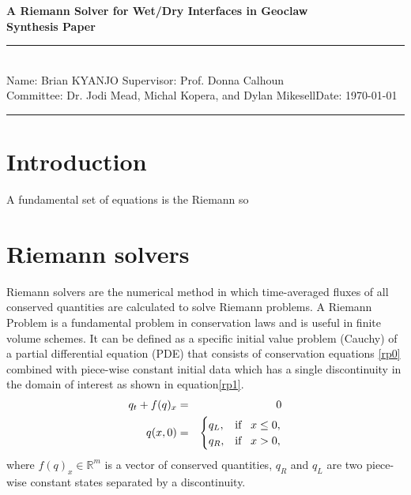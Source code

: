 \documentclass[12pt,a4paper]{article}
\newcommand{\donna}[1]{{\color{red}{#1}}}
\newcommand{\student}{Brian KYANJO }
\newcommand{\course}{Dr. Jodi Mead, Michal Kopera, and Dylan Mikesell}
\newcommand{\assignment}{ Prof. Donna Calhoun}
\begin{document}
	
	\thispagestyle{empty}
	\begin{center}
		\textbf{A Riemann Solver for Wet/Dry Interfaces in Geoclaw \\[0.5cm]
			Synthesis Paper}
		\vspace{.2cm}
	\end{center}
	
	
	\rule{17cm}{0.2cm}\\[0.3cm]
	Name: \student \hfill Supervisor: \assignment\\[0.1cm]
	Committee: \course \hfill Date: \today\\
	\rule{17cm}{0.05cm}
	\vspace{.2cm}
	
	\section{Introduction}
	
	\donna{Motivate five papers:   Dry and Wet states, possible methods, implementations. Applications to tsunamis, flooding, other natural hazards. How do we solve the Riemann problem for wet and dry states?}
	
	A fundamental set of equations is the Riemann so
	
	\section{Riemann solvers}
	Riemann solvers are the numerical method in which time-averaged fluxes of all conserved quantities are calculated to solve Riemann problems.  A Riemann Problem is a fundamental problem in conservation laws and is useful in finite volume schemes. It can be defined as a specific initial value problem  (Cauchy) of a partial differential equation (PDE) that consists of conservation equations \eqref{rp0}  combined with piece-wise constant initial data which has a single discontinuity in the domain of interest as shown in equation\eqref{rp1}\cite{ge:2011}. 
	\begin{eqnarray}
		q_{t} + f(q)_{x}& =& 0
		\label{rp0}\\
		q(x,0)& =& \begin{cases}
			q_{L}, & \text{if \, $x \le 0,$}\\
			q_{R},& \text{if \, $x > 0,$}\\
			
		\end{cases}  
		\label{rp1}     
	\end{eqnarray}
	where $f(q)_{x} \in \mathbb{R}^{m}$ is a vector of conserved quantities,  $q_{R}$ and $q_{L}$ are two piece-wise constant states separated by a discontinuity. 
	
\end{document}

